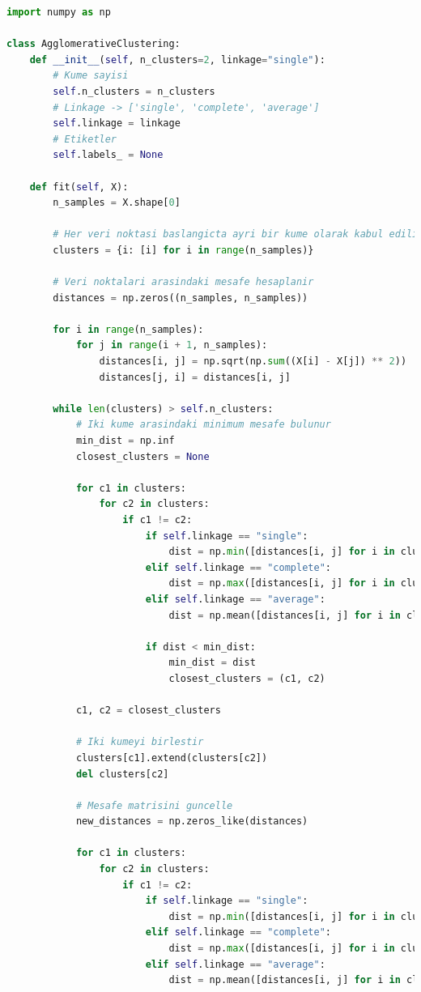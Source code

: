 \begin{lstlisting}[language=Python, caption=Scikit-learn'de AgglomerativeClustering.]
import numpy as np

class AgglomerativeClustering:
    def __init__(self, n_clusters=2, linkage="single"):
        # Kume sayisi
        self.n_clusters = n_clusters
        # Linkage -> ['single', 'complete', 'average']
        self.linkage = linkage
        # Etiketler
        self.labels_ = None

    def fit(self, X):
        n_samples = X.shape[0]

        # Her veri noktasi baslangicta ayri bir kume olarak kabul edilir
        clusters = {i: [i] for i in range(n_samples)}

        # Veri noktalari arasindaki mesafe hesaplanir
        distances = np.zeros((n_samples, n_samples))

        for i in range(n_samples):
            for j in range(i + 1, n_samples):
                distances[i, j] = np.sqrt(np.sum((X[i] - X[j]) ** 2))
                distances[j, i] = distances[i, j]

        while len(clusters) > self.n_clusters:
            # Iki kume arasindaki minimum mesafe bulunur
            min_dist = np.inf
            closest_clusters = None

            for c1 in clusters:
                for c2 in clusters:
                    if c1 != c2:
                        if self.linkage == "single":
                            dist = np.min([distances[i, j] for i in clusters[c1] for j in clusters[c2]])
                        elif self.linkage == "complete":
                            dist = np.max([distances[i, j] for i in clusters[c1] for j in clusters[c2]])
                        elif self.linkage == "average":
                            dist = np.mean([distances[i, j] for i in clusters[c1] for j in clusters[c2]])

                        if dist < min_dist:
                            min_dist = dist
                            closest_clusters = (c1, c2)

            c1, c2 = closest_clusters

            # Iki kumeyi birlestir
            clusters[c1].extend(clusters[c2])
            del clusters[c2]

            # Mesafe matrisini guncelle
            new_distances = np.zeros_like(distances)

            for c1 in clusters:
                for c2 in clusters:
                    if c1 != c2:
                        if self.linkage == "single":
                            dist = np.min([distances[i, j] for i in clusters[c1] for j in clusters[c2]])
                        elif self.linkage == "complete":
                            dist = np.max([distances[i, j] for i in clusters[c1] for j in clusters[c2]])
                        elif self.linkage == "average":
                            dist = np.mean([distances[i, j] for i in clusters[c1] for j in clusters[c2]])
                        

\end{lstlisting}
